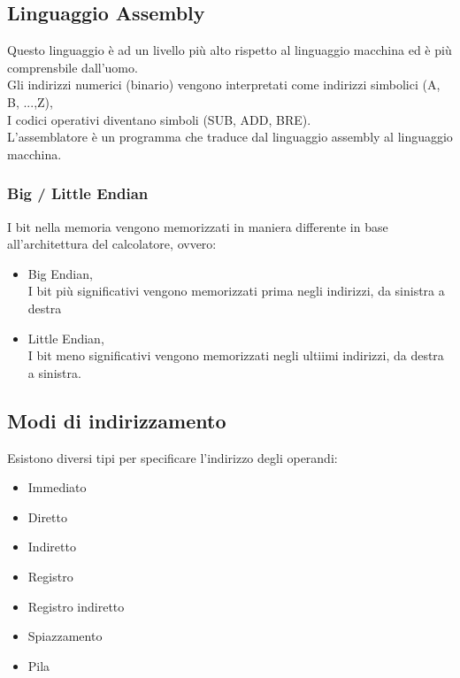\documentclass[arch.tex]{subfiles}
\begin{document}
\subsection{Linguaggio Assembly}%
\label{sub:linguaggio_assembly}
Questo linguaggio è ad un livello più alto rispetto al linguaggio macchina ed è più comprensbile dall'uomo.\\
Gli indirizzi numerici (binario) vengono interpretati come indirizzi simbolici (A, B, ...,Z),\\
I codici operativi diventano simboli (SUB, ADD, BRE).\\
L'assemblatore è un programma che traduce dal linguaggio assembly al linguaggio macchina.\\

\subsubsection{Big / Little Endian}
I bit nella memoria vengono memorizzati in maniera differente in base all'architettura del calcolatore, ovvero:

\begin{itemize}
	\item Big Endian,\\
		I bit più significativi vengono memorizzati prima negli indirizzi, da sinistra a destra
	\item Little Endian,\\
		I bit meno significativi vengono memorizzati negli ultiimi indirizzi, da destra a sinistra.	
\end{itemize}


\subsection{Modi di indirizzamento}%
\label{sub:modi_di_indirizzamento}

Esistono diversi tipi per specificare l'indirizzo degli operandi:

\begin{itemize}
	\item Immediato
	\item Diretto
	\item Indiretto
	\item Registro
	\item Registro indiretto
	\item Spiazzamento
	\item Pila
\end{itemize}
\end{document}
